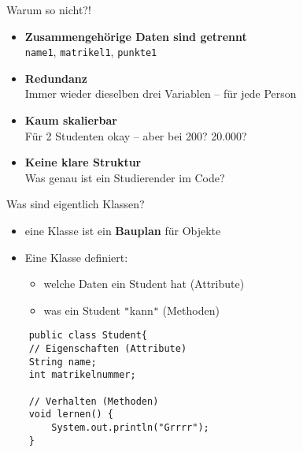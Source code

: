 \documentclass{../../presentation}
\begin{document}
\begin{frame}[fragile]{Warum so nicht?!}
	\begin{itemize}
		\item \textbf{Zusammengehörige Daten sind getrennt} \\
		      \texttt{name1}, \texttt{matrikel1}, \texttt{punkte1}
		\item \textbf{Redundanz} \\
		      Immer wieder dieselben drei Variablen – für jede Person
		\item \textbf{Kaum skalierbar} \\
		      Für 2 Studenten okay – aber bei 200? 20.000?
		\item \textbf{Keine klare Struktur} \\
		      Was genau ist ein Studierender im Code?
	\end{itemize}
\end{frame}




\begin{frame}[fragile]{Was sind eigentlich Klassen?}
	\begin{itemize}
    \item eine Klasse ist ein \textbf{Bauplan} für Objekte
		\item Eine Klasse definiert:
		      \begin{itemize}
			      \item[\textbullet] welche Daten ein Student hat (Attribute)
			      \item[\textbullet] was ein Student \texttt{"}kann\texttt{"} (Methoden)
		      \end{itemize}
	\end{itemize}
  
  \begin{verbatim}
    public class Student{
    // Eigenschaften (Attribute)
    String name;
    int matrikelnummer;

    // Verhalten (Methoden)
    void lernen() {
        System.out.println("Grrrr");
    }
  \end{verbatim}
\end{frame}
\end{document}
